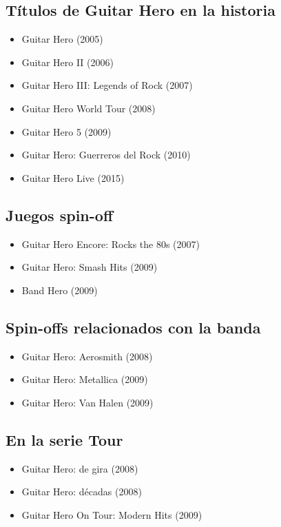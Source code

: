 \documentclass[12pt]{article}
\begin{document}
\subsection{Títulos de Guitar Hero en la historia}
    \begin{itemize}
        \item Guitar Hero (2005)
        \item Guitar Hero II (2006)
        \item Guitar Hero III: Legends of Rock (2007)
        \item 	Guitar Hero World Tour (2008)
         \item Guitar Hero 5 (2009)
        \item 	Guitar Hero: Guerreros del Rock (2010)
        \item Guitar Hero Live (2015)
        \newline
    \end{itemize}
    \subsection{Juegos spin-off}
    \begin{itemize}
        \item Guitar Hero Encore: Rocks the 80s (2007)
        \item Guitar Hero: Smash Hits (2009)
        \item	Band Hero (2009)
        \newline
    \end{itemize}
    \subsection{Spin-offs relacionados con la banda}
    \begin{itemize}
      \item Guitar Hero: Aerosmith (2008)
      \item Guitar Hero: Metallica (2009)
      \item Guitar Hero: Van Halen (2009)
    \newline
    \end{itemize}
    \subsection{En la serie Tour}
    \begin{itemize}
     \item	Guitar Hero: de gira (2008)
     \item	Guitar Hero: décadas (2008)
    \item Guitar Hero On Tour: Modern Hits (2009)


    \end{itemize}
    
\end{document}
